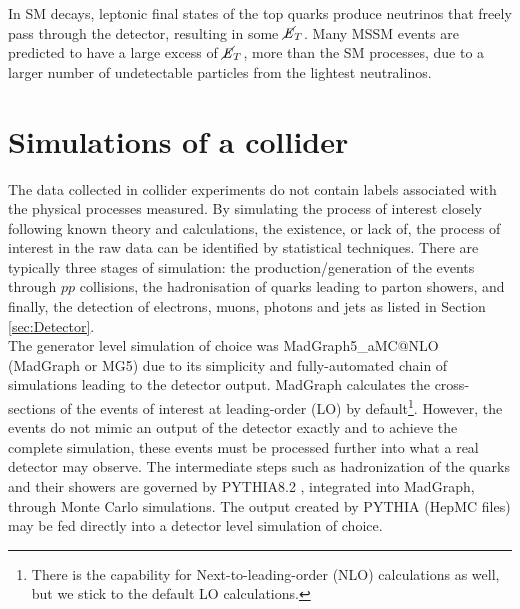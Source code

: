 In SM decays, leptonic final states of the top quarks produce neutrinos that freely pass through the detector, resulting in some $\cancel{\it{E}}_{T}$. Many MSSM events are predicted to have a large excess of $\cancel{\it{E}}_{T}$, more than the SM processes, due to a larger number of undetectable particles from the lightest neutralinos.  \\ 

\section{Simulations of a collider}
\label{sec:Sims}
The data collected in collider experiments do not contain labels associated with the physical processes measured. By simulating the process of interest closely following known theory and calculations, the existence, or lack of, the process of interest in the raw data can be identified by statistical techniques. There are typically three stages of simulation: the production/generation of the events through $pp$ collisions, the hadronisation of quarks leading to parton showers, and finally, the detection of electrons, muons, photons and jets as listed in Section \ref{sec:Detector}. \\

The generator level simulation of choice was MadGraph5\_aMC@NLO \cite{alwall2014automated} (MadGraph or MG5) due to its simplicity and fully-automated chain of simulations leading to the detector output. MadGraph calculates the cross-sections of the events of interest at leading-order (LO) by default\footnote{There is the capability for Next-to-leading-order (NLO) calculations as well, but we stick to the default LO calculations.}. However, the events do not mimic an output of the detector exactly and to achieve the complete simulation, these events must be processed further into what a real detector may observe. The intermediate steps such as hadronization of the quarks and their showers are governed by PYTHIA8.2 \cite{sjostrand2015introduction}, integrated into MadGraph, through Monte Carlo simulations. The output created by PYTHIA (HepMC files) may be fed directly into a detector level simulation of choice. \\


